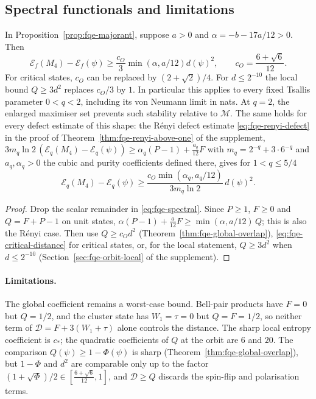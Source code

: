 \subsection{Spectral functionals and limitations}
\label{sec:fqe-orbit-consequences}
\begin{corollary}\label{cor:fqe-orbit-spectral}
In Proposition~\ref{prop:fqe-majorant}, suppose $a>0$ and
$\alpha=-b-17a/12>0$. Then
\[
 \mathcal E_f(M_4)-\mathcal E_f(\psi)
 \ge\frac{c_O}{3}\min(\alpha,a/12)d(\psi)^2,\qquad c_O=\frac{6+\sqrt6}{12}.
\]
For critical states, $c_O$ can be replaced by $(2+\sqrt2)/4$.
For $d\le2^{-10}$ the local bound $Q\ge3d^2$ replaces $c_O/3$ by $1$.
In particular this applies to every fixed Tsallis parameter $0<q<2$,
including its von Neumann limit in nats. At $q=2$, the enlarged
maximiser set prevents such stability relative to $\mathcal M$.
The same holds for every defect estimate of this shape: the R\'enyi
defect estimate \eqref{eq:fqe-renyi-defect} in the proof of
Theorem~\ref{thm:fqe-renyi-above-one} of the supplement,
$3m_q\ln2\,(\mathcal E_q(M_4)-\mathcal E_q(\psi))\ge\alpha_q(P-1)+\frac{a_q}{12}F$
with $m_q=2^{-q}+3\cdot6^{-q}$ and $a_q,\alpha_q>0$ the cubic and purity coefficients defined there, gives for $1<q\le5/4$
\[
 \mathcal E_q(M_4)-\mathcal E_q(\psi)
 \ge\frac{c_O\min(\alpha_q,a_q/12)}{3m_q\ln2}\,d(\psi)^2 .
\]
\end{corollary}
\begin{proof} Drop the scalar remainder in \eqref{eq:fqe-spectral}. Since $P\ge1$, $F\ge0$ and $Q=F+P-1$ on unit states,
$\alpha(P-1)+\frac a{12}F\ge\min(\alpha,a/12)\,Q$; this is also the R\'enyi case. Then use $Q\ge c_Od^2$
(Theorem~\ref{thm:fqe-global-overlap}), \eqref{eq:fqe-critical-distance} for critical states, or, for the local
statement, $Q\ge3d^2$ when $d\le2^{-10}$ (Section~\ref{sec:fqe-orbit-local} of the supplement). \end{proof}

\paragraph{Limitations.}
The global coefficient remains a worst-case bound. Bell-pair products have
$F=0$ but $Q=1/2$, and the cluster state has $W_1=\tau=0$ but
$Q=F=1/2$, so neither term of $\mathcal D=F+3(W_1+\tau)$ alone controls the distance. The sharp local entropy
coefficient is $c_*$; the quadratic coefficients of $Q$ at the orbit are $6$ and $20$.
The comparison $Q(\psi)\ge1-\Phi(\psi)$ is sharp (Theorem~\ref{thm:fqe-global-overlap}), but $1-\Phi$ and
$d^2$ are comparable only up to the factor $(1+\sqrt\Phi)/2\in[\frac{6+\sqrt6}{12},1]$, and $\mathcal D\ge Q$ discards the
spin-flip and polarisation terms.
